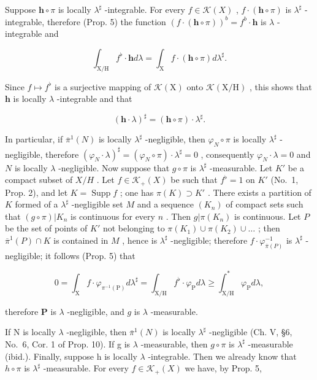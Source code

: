 Suppose \(\mathbf{h} \circ \pi\) is locally \(\lambda^{\sharp}\) -integrable. For every \(f \in \mathcal{K}(X)\) , \(f \cdot (\mathbf{h} \circ \pi)\) is \(\lambda^{\sharp}\) -integrable, therefore (Prop. 5) the function \((f \cdot (\mathbf{h} \circ \pi))^b = f^b \cdot \mathbf{h}\) is \(\lambda\) -integrable and

\[
\int_ {\mathrm{X} / \mathrm{H}} f ^ {\flat} \cdot \mathbf {h} d \lambda = \int_ {\mathrm{X}} f \cdot (\mathbf {h} \circ \pi) d \lambda^ {\sharp}.
\]

Since \(f \mapsto f^{\flat}\) is a surjective mapping of \(\mathcal{K}(\mathrm{X})\) onto \(\mathcal{K}(\mathrm{X}/\mathrm{H})\) , this shows that \(\mathbf{h}\) is locally \(\lambda\) -integrable and that

\[
(\mathbf {h} \cdot \lambda) ^ {\sharp} = (\mathbf {h} \circ \pi) \cdot \lambda^ {\sharp}.
\]

In particular, if \(\overline{\pi}^{1}(N)\) is locally \(\lambda^{\sharp}\) -negligible, then \(\varphi_{N} \circ \pi\) is locally \(\lambda^{\sharp}\) -negligible, therefore \((\varphi_{N} \cdot \lambda)^{\sharp} = (\varphi_{N} \circ \pi) \cdot \lambda^{\sharp} = 0\) , consequently \(\varphi_{N} \cdot \lambda = 0\) and \(N\) is locally \(\lambda\) -negligible. Now suppose that \(g \circ \pi\) is \(\lambda^{\sharp}\) -measurable. Let \(K'\) be a compact subset of \(X/H\) . Let \(f \in \mathcal{K}_{+}(X)\) be such that \(f^{\flat} = 1\) on \(K'\) (No.~1, Prop. 2), and let \(K = \operatorname{Supp} f\) ; one has \(\pi(K) \supset K'\) . There exists a partition of \(K\) formed of a \(\lambda^{\sharp}\) -negligible set \(M\) and a sequence \((K_n)\) of compact sets such that \((g \circ \pi)|K_n\) is continuous for every \(n\) . Then \(g|\pi(K_n)\) is continuous. Let \(P\) be the set of points of \(K'\) not belonging to \(\pi(K_1) \cup \pi(K_2) \cup \ldots\) ; then \(\overline{\pi}^{1}(P) \cap K\) is contained in \(M\) , hence is \(\lambda^{\sharp}\) -negligible; therefore \(f \cdot \varphi_{\overline{\pi}(P)}^{-1}\) is \(\lambda^{\sharp}\) -negligible; it follows (Prop. 5) that

\[
0 = \int_ {\mathrm{X}} f \cdot \varphi_ {\pi^ {- 1} (\mathrm{P})} d \lambda^ {\sharp} = \int_ {\mathrm{X/H}} f ^ {\flat} \cdot \varphi_ {\mathrm{P}} d \lambda \geqslant \int_ {\mathrm{X/H}} ^ {*} \varphi_ {\mathrm{P}} d \lambda ,
\]

therefore \(\mathbf{P}\) is \(\lambda\) -negligible, and \(g\) is \(\lambda\) -measurable.

If N is locally \(\lambda\) -negligible, then \(\overline{\pi}^{1}(N)\) is locally \(\lambda^{\sharp}\) -negligible (Ch. V, §6, No.~6, Cor. 1 of Prop. 10). If g is \(\lambda\) -measurable, then \(g \circ \pi\) is \(\lambda^{\sharp}\) -measurable (ibid.). Finally, suppose h is locally \(\lambda\) -integrable. Then we already know that \(h \circ \pi\) is \(\lambda^{\sharp}\) -measurable. For every \(f \in \mathcal{K}_{+}(X)\) we have, by Prop. 5,

